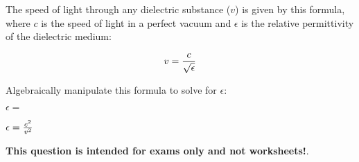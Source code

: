 

The speed of light through any dielectric substance ($v$) is given by this formula, where $c$ is the speed of light in a perfect vacuum and $\epsilon$ is the relative permittivity of the dielectric medium:
 
$$v = {c \over \sqrt{\epsilon}}$$

Algebraically manipulate this formula to solve for $\epsilon$:

\vskip 20pt

$\epsilon = $







$\epsilon = {c^2 \over v^2}$







{\bf This question is intended for exams only and not worksheets!}.



